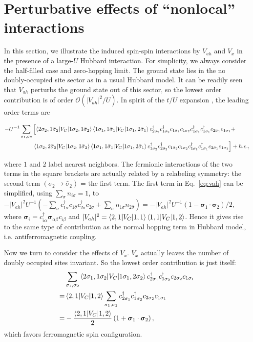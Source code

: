 \documentclass[%
 reprint,
 superscriptaddress,
 amsmath,amssymb,
 aps,
 prx,
 floatfix,
]{revtex4-2}
\newcommand{\<}{\langle}
\renewcommand{\>}{\rangle}
\renewcommand{\(}{\left(}
\renewcommand{\)}{\right)}
\renewcommand{\[}{\left[}
\renewcommand{\]}{\right]}
\begin{document}
\section{\label{app:tU}Perturbative effects of ``nonlocal'' interactions}
In this section, we illustrate the induced spin-spin interactions by $V_{ah}$ and $V_x$ in the presence of a large-$U$ Hubbard interaction. For simplicity, we always consider the half-filled case and zero-hopping limit. The ground state lies in the no doubly-occupied site sector as in a usual Hubbard model. It can be readily seen that $V_{ah}$ perturbs the ground state out of this sector, so the lowest order contribution is of order $\mathcal{O}(|V_{ah}|^2/U)$. In spirit of the $t/U$ expansion \cite{allanPhysRevB.37.9753}, the leading order terms are
\begin{widetext}
\begin{align}
    -U^{-1}\sum_{\sigma_1,\sigma_2}&\[\braket{2\sigma_2,1\bar{\sigma}_2|V_C|1\sigma_2,1\bar{\sigma}_2}\braket{1\sigma_1,1\bar{\sigma}_1|V_C|1\sigma_1,2\bar{\sigma}_1}c^{\dag}_{2\sigma_2}c^{\dag}_{1\bar{\sigma}_2}c_{1\bar{\sigma}_2}c_{1\sigma_2}c^{\dag}_{1\sigma_1}c^{\dag}_{1\bar{\sigma}_1}c_{2\bar{\sigma}_1}c_{1\sigma_1}+\right. \nonumber\\
    & \left. \braket{1\sigma_2,2\bar{\sigma}_2|V_C|1\sigma_2,1\bar{\sigma}_2}\braket{1\sigma_1,1\bar{\sigma}_1|V_C|1\sigma_1,2\bar{\sigma}_1}c^{\dag}_{1\sigma_2}c^{\dag}_{2\bar{\sigma}_2}c_{1\bar{\sigma}_2}c_{1\sigma_2}c^{\dag}_{1\sigma_1}c^{\dag}_{1\bar{\sigma}_1}c_{2\bar{\sigma}_1}c_{1\sigma_1}\]+h.c.,\label{eq:vah}
\end{align}
\end{widetext}
where $1$ and $2$ label nearest neighbors.
The fermionic interactions of the two terms in the square brackets are actually related by a relabeling symmetry: the second term $(\sigma_2\rightarrow\bar{\sigma}_2)$ = the first term. The first term in Eq.~\eqref{eq:vah} can be simplified, using $\sum_{\sigma}n_{i\sigma} = 1$, to $-|V_{ah}|^2U^{-1}\(-\sum_{\sigma}c^{\dag}_{1\sigma}c_{1\bar{\sigma}}c^{\dag}_{2\bar{\sigma}}c_{2{\sigma}}+\sum_{\sigma}n_{1\sigma}n_{2\bar{\sigma}}\) = -|V_{ah}|^2U^{-1} \(1-\bm{\sigma}_1\cdot\bm{\sigma}_2\)/2$, where $\bm{\sigma}_i = c^{\dag}_{i\alpha}\bm{\sigma}_{\alpha\beta}c_{i\beta}$ and $|V_{ah}|^2 = \braket{2,1|V_C|1,1}\braket{1,1|V_C|1,2}$. Hence it gives rise to the same type of contribution as the normal hopping term in Hubbard model, i.e. antiferromagnetic coupling. 

Now we turn to consider the effects of $V_x$. $V_x$ actually leaves the number of doubly occupied sites invariant. So the lowest order contribution is just itself:
\begin{align}
    &\sum_{\sigma_1,\sigma_2}\braket{2\sigma_1,1\sigma_2|V_C|1\sigma_1,2\sigma_2}c^{\dag}_{2\sigma_1}c^{\dag}_{1\sigma_2}c_{2\sigma_2}c_{1\sigma_1}\\
    =& \braket{2,1|V_C|1,2}\sum_{\sigma_1,\sigma_2}c^{\dag}_{2\sigma_1}c^{\dag}_{1\sigma_2}c_{2\sigma_2}c_{1\sigma_1}\\
    =& -\frac{\braket{2,1|V_C|1,2}}{2}\(1+\bm{\sigma}_1\cdot\bm{\sigma}_2\),
\end{align}
which favors ferromagnetic spin configuration. 

\end{document}

